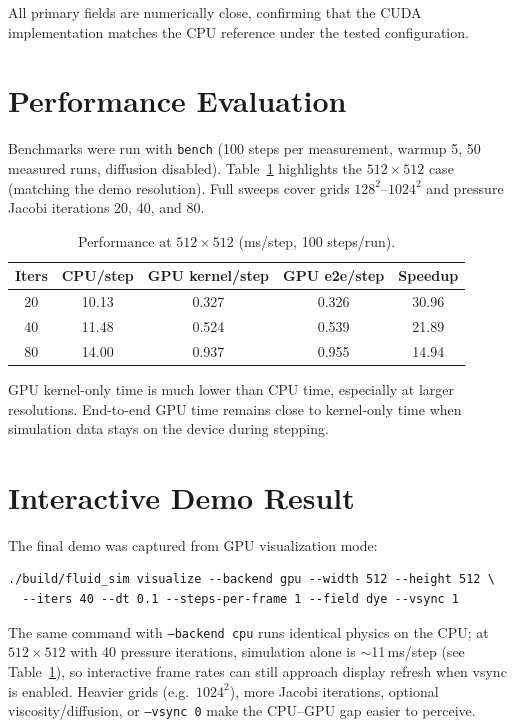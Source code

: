\documentclass[10pt,a4paper]{article}
\begin{document}
All primary fields are numerically close, confirming that the CUDA implementation matches the CPU reference under the tested configuration.

\section{Performance Evaluation}
Benchmarks were run with \texttt{bench} (100 steps per measurement, warmup 5, 50 measured runs, diffusion disabled). Table~\ref{tab:perf512} highlights the $512 \times 512$ case (matching the demo resolution). Full sweeps cover grids $128^2$--$1024^2$ and pressure Jacobi iterations 20, 40, and 80.

\begin{table}[H]
\centering
\caption{Performance at $512 \times 512$ (ms/step, 100 steps/run).}
\label{tab:perf512}
\begin{tabular}{ccccc}
\toprule
Iters & CPU/step & GPU kernel/step & GPU e2e/step & Speedup \\
\midrule
20 & 10.13 & 0.327 & 0.326 & 30.96 \\
40 & 11.48 & 0.524 & 0.539 & 21.89 \\
80 & 14.00 & 0.937 & 0.955 & 14.94 \\
\bottomrule
\end{tabular}
\end{table}

GPU kernel-only time is much lower than CPU time, especially at larger resolutions. End-to-end GPU time remains close to kernel-only time when simulation data stays on the device during stepping.

\section{Interactive Demo Result}
The final demo was captured from GPU visualization mode:
\begin{verbatim}
./build/fluid_sim visualize --backend gpu --width 512 --height 512 \
  --iters 40 --dt 0.1 --steps-per-frame 1 --field dye --vsync 1
\end{verbatim}

The same command with \texttt{--backend cpu} runs identical physics on the CPU; at $512 \times 512$ with 40 pressure iterations, simulation alone is $\sim$11\,ms/step (see Table~\ref{tab:perf512}), so interactive frame rates can still approach display refresh when vsync is enabled. Heavier grids (e.g.\ $1024^2$), more Jacobi iterations, optional viscosity/diffusion, or \texttt{--vsync 0} make the CPU--GPU gap easier to perceive.
\end{document}
